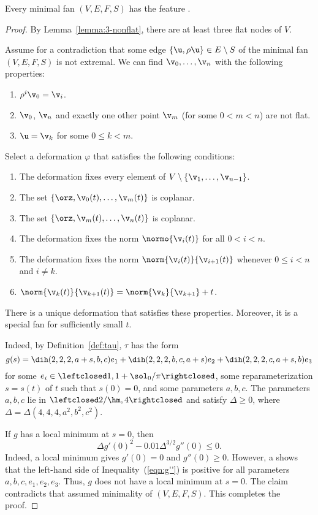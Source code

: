 \begin{lemma}[]
Every minimal fan $(V,E,F,S)$ has the feature .
\end{lemma}

\begin{proof} 
By Lemma~\ref{lemma:3-nonflat}, there are at least three flat
nodes of $V$.

Assume for a contradiction that some edge $\{\u,\rho\u\}\in
E\setminus S$ of the minimal fan $(V,E,F,S)$ is not extremal.  
We can find $\v_0,\ldots,\v_n$ with the following properties:
\begin{enumerate}\wasitemize 
\item $\rho^i\v_0 =\v_i$.
\item $\v_0$, $\v_n$ and exactly one other point $\v_m$ (for some
  $0<m<n$) are not flat.
\item $\u=\v_k$ for some $0\le k<m$.
\end{enumerate}\wasitemize 

Select a deformation $\varphi$ that satisfies the following conditions:
\begin{enumerate}\wasitemize 
\item The deformation fixes every element of
$V\setminus\{\v_1,\ldots,\v_{n-1}\}$.
\item The set $\{\orz,\v_0(t),\ldots,\v_m(t)\}$ is coplanar.
\item The set $\{\orz,\v_m(t),\ldots,\v_n(t)\}$ is coplanar.
\item The deformation  fixes the norm $\normo{\v_i(t)}$ for all $0<i<n$.
\item The deformation fixes the norm $\norm{\v_i(t)}{\v_{i+1}(t)}$
  whenever $0\le i<n$ and $i\ne k$.
\item $\norm{\v_k(t)}{\v_{k+1}(t)} = \norm{\v_k}{\v_{k+1}}+t$.
\end{enumerate}\wasitemize 
There is a unique deformation that satisfies these properties.  Moreover, it
is a special fan for sufficiently small $t$.

  Indeed, by Definition~\ref{def:tau},
$\tau$ has the form
\[ 
  g(s) = \dih(2,2,2,a+s,b,c) e_1 
+ \dih(2,2,2,b,c,a+s) e_2 + \dih(2,2,2,c,a+s,b) e_3
\] 
for some $e_i\in\leftclosed1,1+\sol_0/\pi\rightclosed$, some
reparameterization $s=s(t)$ of $t$ such that $s(0)=0$, and some
parameters $a,b,c$.  The parameters $a,b,c$ lie in
$\leftclosed2/\hm,4\rightclosed$ and satisfy $\Delta\ge0$, where
$\Delta = \Delta(4,4,4,a^2,b^2,c^2)$.

If $g$ has a local minimum at $s=0$, then
\begin{equation}\label{eqn:g''}
\Delta g'(0)^2 - 0.01\Delta^{3/2} g''(0) \le 0.
\end{equation}
Indeed, a local minimum gives $g'(0)=0$ and $g''(0)\ge0$.  However,
a  shows that the left-hand side of
Inequality~(\ref{eqn:g''}) is positive for all parameters
$a,b,c,e_1,e_2,e_3$.  Thus, $g$ does not have a local minimum at
$s=0$.  The claim contradicts that assumed minimality of $(V,E,F,S)$.
This completes the proof.
\end{proof}


